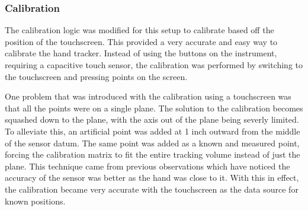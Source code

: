 \subsubsection{Calibration}

The calibration logic was modified for this setup to calibrate based off the position of the touchscreen.
This provided a very accurate and easy way to calibrate the hand tracker.
Instead of using the buttons on the instrument, requiring a capacitive touch sensor, the calibration was performed by switching to the touchscreen and pressing points on the screen.

One problem that was introduced with the calibration using a touchscreen was that all the points were on a single plane.
The solution to the calibration becomes squashed down to the plane, with the axis out of the plane being severly limited.
To alleviate this, an artificial point was added at 1 inch outward from the middle of the sensor datum.
The same point was added as a known and measured point, forcing the calibration matrix to fit the entire tracking volume instead of just the plane.
This technique came from previous observations which have noticed the accuracy of the sensor was better as the hand was close to it.
With this in effect, the calibration became very accurate with the touchscreen as the data source for known positions.
